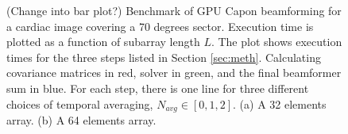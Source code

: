 \documentclass[journal]{IEEEtran}
\begin{document}

\begin{figure}[!t]
\centerline{
\hfil
{}}
\caption{(Change into bar plot?) Benchmark of GPU Capon beamforming for a cardiac image covering a 70 degrees sector. Execution time is plotted as a function of subarray length $L$. The plot shows execution times for the three steps listed in Section \ref{sec:meth}. Calculating covariance matrices in red, solver in green, and the final beamformer sum in blue. For each step, there is one line for three different choices of temporal averaging, $N_{avg} \in [0, 1, 2]$. (a) A 32 elements array. (b) A 64 elements array.}
\label{fig:bench}
\end{figure}
\end{document}
